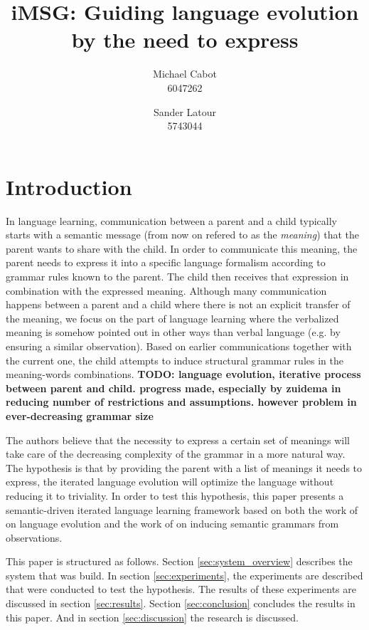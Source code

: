 \documentclass[a4paper]{article}
\title{iMSG: Guiding language evolution by the need to express}
\author{Michael Cabot\\6047262 \and Sander Latour\\5743044}
\begin{document}
\maketitle
\section{Introduction}
\cite{zuidema2003poverty} \cite{batali1999negotiation}
In language learning, communication between a parent and a child typically starts with a semantic message (from now on refered to as the \emph{meaning}) that the parent wants to share with the child. In order to communicate this meaning, the parent needs to express it into a specific language formalism according to grammar rules known to the parent. The child then receives that expression in combination with the expressed meaning. Although many communication happens between a parent and a child where there is not an explicit transfer of the meaning, we focus on the part of language learning where the verbalized meaning is somehow pointed out in other ways than verbal language (e.g. by ensuring a similar observation). Based on earlier communications together with the current one, the child attempts to induce structural grammar rules in the meaning-words combinations.
\textbf{TODO: language evolution, iterative process between parent and child. progress made, especially by zuidema in reducing number of restrictions and assumptions. however problem in ever-decreasing grammar size}

The authors believe that the necessity to express a certain set of meanings will take care of the decreasing complexity of the grammar in a more natural way. The hypothesis is that by providing the parent with a list of meanings it needs to express, the iterated language evolution will optimize the language without reducing it to triviality. In order to test this hypothesis, this paper presents a semantic-driven iterated language learning framework based on both the work of \cite{zuidema2003poverty} on language evolution and the work of \cite{batali1999negotiation} on inducing semantic grammars from observations.

This paper is structured as follows. Section \ref{sec:system_overview} describes the system that was build. In section \ref{sec:experiments}, the experiments are described that were conducted to test the hypothesis. The results of these experiments are discussed in section \ref{sec:results}. Section \ref{sec:conclusion} concludes the results in this paper. And in section \ref{sec:discussion} the research is discussed.
\end{document}
